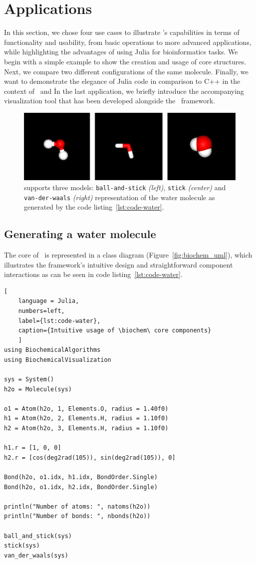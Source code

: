 
\section{Applications}


In this section, we chose four use cases to illustrate \biochem's capabilities in terms of functionality and usability, from basic operations to more advanced applications, while highlighting the advantages of using Julia for bioinformatics tasks.
We begin with a simple example to show the creation and usage of core structures. Next, we compare two different configurations of the same molecule. Finally, we want to demonstrate the elegance of Julia code in comparison to C++ in the context of \ball\ and \biochem\. In the last application, we briefly introduce the accompanying visualization tool \bioviz that has been developed alongside the \biochem\ framework.
 \begin{figure}[t]
	\includegraphics[width=18cm]{gfx/biovis-2.png}
	\caption{\bioviz supports three models:  \texttt{ball-and-stick} \textit{(left)}, \texttt{stick} \textit{(center)} and \texttt{van-der-waals} \textit{(right)} representation of the water molecule as generated by the code listing~\ref{lst:code-water}.}
	\label{fig:biochem_water}
\end{figure}

\subsection{Generating a water molecule}


The core of \biochem\ is represented in a class diagram (Figure~\ref{fig:biochem_uml}), which illustrates the framework's intuitive design and straightforward component interactions as can be seen in code listing~\ref{lst:code-water}. 
\begin{lstlisting}[
	language = Julia, 
	numbers=left, 
	label={lst:code-water}, 
	caption={Intuitive usage of \biochem\ core components}
	]
using BiochemicalAlgorithms
using BiochemicalVisualization
	
sys = System() 
h2o = Molecule(sys)
	
o1 = Atom(h2o, 1, Elements.O, radius = 1.40f0)
h1 = Atom(h2o, 2, Elements.H, radius = 1.10f0)
h2 = Atom(h2o, 3, Elements.H, radius = 1.10f0)
	
h1.r = [1, 0, 0]
h2.r = [cos(deg2rad(105)), sin(deg2rad(105)), 0]

Bond(h2o, o1.idx, h1.idx, BondOrder.Single)
Bond(h2o, o1.idx, h2.idx, BondOrder.Single)
	
println("Number of atoms: ", natoms(h2o))
println("Number of bonds: ", nbonds(h2o))
	
ball_and_stick(sys)	
stick(sys)
van_der_waals(sys)
\end{lstlisting}

